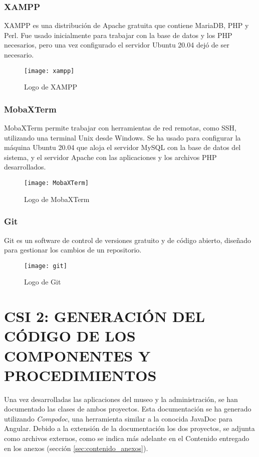 \subsubsection{XAMPP}
XAMPP es una distribución de Apache gratuita que contiene MariaDB, PHP y Perl\cite{Xampp}. Fue usado inicialmente para trabajar con la base de datos y los PHP necesarios, pero una vez configurado el servidor Ubuntu 20.04 dejó de ser necesario.
\begin{figure}[H]
	\centering
	\texttt{[image: xampp]}
	\caption{Logo de XAMPP}
\end{figure}
\subsubsection{MobaXTerm}
MobaXTerm permite trabajar con herramientas de red remotas, como SSH, utilizando una terminal Unix desde Windows. Se ha usado para configurar la máquina Ubuntu 20.04 que aloja el servidor MySQL con la base de datos del sistema, y el servidor Apache con las aplicaciones y los archivos PHP desarrollados.
\begin{figure}[H]
	\centering
	\texttt{[image: MobaXTerm]}
	\caption{Logo de MobaXTerm}
\end{figure}

\subsubsection{Git}
Git es un software de control de versiones gratuito y de código abierto, diseñado para gestionar los cambios de un repositorio\cite{Git}.
\begin{figure}[H]
	\centering
	\texttt{[image: git]}
	\caption{Logo de Git}
\end{figure}

\newpage
\section[CSI 2: GENERACIÓN DEL CÓDIGO DE LOS COMPONENTES Y \\ PROCEDIMIENTOS]{CSI 2: GENERACIÓN DEL CÓDIGO DE LOS COMPONENTES Y PROCEDIMIENTOS}
Una vez desarrolladas las aplicaciones del museo y la administración, se han documentado las clases de ambos proyectos. Esta documentación se ha generado utilizando \textit{Compodoc}\cite{compodoc}, una herramienta similar a la conocida JavaDoc para Angular. Debido a la extensión de la documentación los dos proyectos, se adjunta como archivos externos, como se indica más adelante en el Contenido entregado en los anexos (sección \ref{sec:contenido_anexos}).


